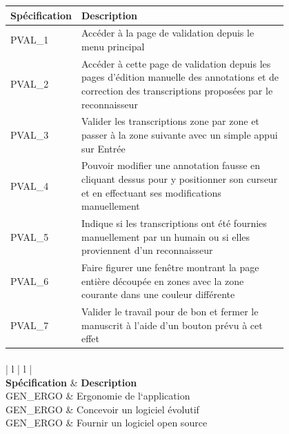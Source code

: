 \begin{center}
\begin{tabular}{ | l | p{0.8\linewidth} | }
	\hline
	\textbf{Spécification} & \textbf{Description} \\
	\hline
	PVAL\_1 & Accéder à la page de validation depuis le menu principal \\
	\hline
	PVAL\_2 & Accéder à cette page de validation depuis les pages d’édition manuelle des annotations et de correction des transcriptions proposées par le reconnaisseur \\
	\hline
	PVAL\_3 & Valider les transcriptions zone par zone et passer à la zone suivante avec un simple appui sur Entrée \\
	\hline
	PVAL\_4 & Pouvoir modifier une annotation fausse en cliquant dessus pour y positionner son curseur et en effectuant ses modifications manuellement \\
	\hline
	PVAL\_5 & Indique si les transcriptions ont été fournies manuellement par un humain ou si elles proviennent d’un reconnaisseur \\
	\hline
	PVAL\_6 & Faire figurer une fenêtre montrant la page entière découpée en zones avec la zone courante dans une couleur différente \\
	\hline
	PVAL\_7 & Valider le travail pour de bon et fermer le manuscrit à l’aide d’un bouton prévu à cet effet \\
	\hline
\end{tabular}

\paragraph{}
\begin{tabular}{ | l | l | }
	\hline
	 \\
	\hline
	\textbf{Spécification} & \textbf{Description} \\
	\hline
	GEN\_ERGO & Ergonomie de l‘application \\
	\hline
	GEN\_ERGO & Concevoir un logiciel évolutif \\
	\hline
	GEN\_ERGO & Fournir un logiciel open source \\
	\hline
\end{tabular}

\end{center}

\paragraph{}

